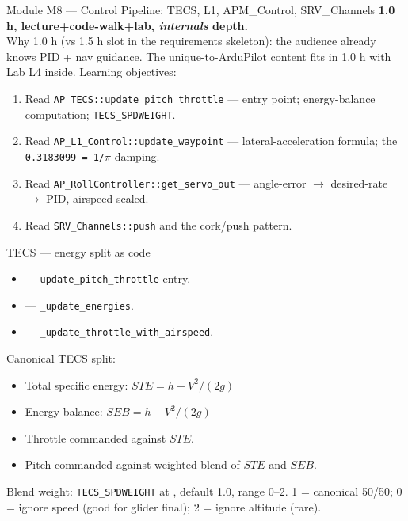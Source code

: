 \documentclass[aspectratio=169,11pt]{beamer}
\begin{document}
\begin{frame}{Module M8 --- Control Pipeline: TECS, L1, APM\_Control, SRV\_Channels}
  \textbf{1.0 h, lecture+code-walk+lab, \emph{internals} depth.}\\[1ex]
  Why 1.0 h (vs 1.5 h slot in the requirements skeleton): the audience already knows PID + nav guidance. The unique-to-ArduPilot content fits in 1.0 h with Lab L4 inside.
  \vfill
  Learning objectives:
  \begin{enumerate}
    \item Read \texttt{AP\_TECS::update\_pitch\_throttle} --- entry point; energy-balance computation; \texttt{TECS\_SPDWEIGHT}.
    \item Read \texttt{AP\_L1\_Control::update\_waypoint} --- lateral-acceleration formula; the \texttt{0.3183099 = 1/$\pi$} damping.
    \item Read \texttt{AP\_RollController::get\_servo\_out} --- angle-error $\rightarrow$ desired-rate $\rightarrow$ PID, airspeed-scaled.
    \item Read \texttt{SRV\_Channels::push} and the cork/push pattern.
  \end{enumerate}
\end{frame}

\begin{frame}{TECS --- energy split as code}
  \begin{itemize}
    \item {} --- \texttt{update\_pitch\_throttle} entry.
    \item {} --- \texttt{\_update\_energies}.
    \item {} --- \texttt{\_update\_throttle\_with\_airspeed}.
  \end{itemize}
  \vfill
  Canonical TECS split:
  \begin{itemize}
    \item Total specific energy: $STE = h + V^2/(2g)$
    \item Energy balance: $SEB = h - V^2/(2g)$
    \item Throttle commanded against $STE$.
    \item Pitch commanded against weighted blend of $STE$ and $SEB$.
  \end{itemize}
  \vfill
  Blend weight: \texttt{TECS\_SPDWEIGHT} at , default 1.0, range 0--2. 1 = canonical 50/50; 0 = ignore speed (good for glider final); 2 = ignore altitude (rare).
\end{frame}
\end{document}
